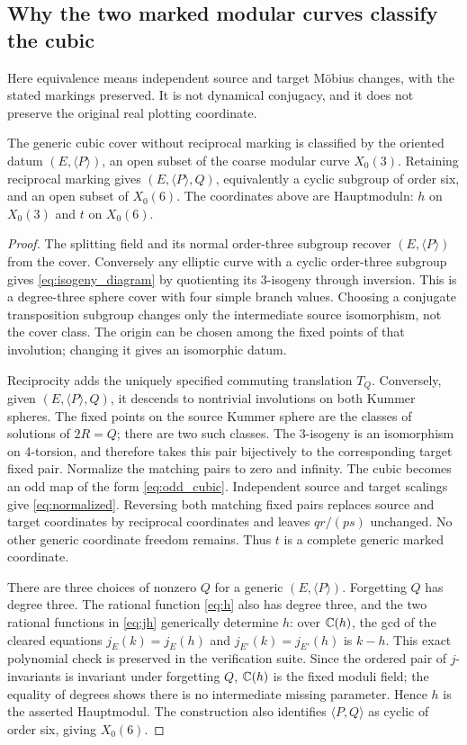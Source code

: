 \subsection{Why the two marked modular curves classify the cubic}\label{sec:moduli_proof}
Here equivalence means independent source and target Möbius changes, with the stated markings preserved. It is not dynamical conjugacy, and it does not preserve the original real plotting coordinate.

\begin{proposition}\label{prop:moduli}
The generic cubic cover without reciprocal marking is classified by the oriented datum \((E,\langle P\rangle)\), an open subset of the coarse modular curve \(X_0(3)\). Retaining reciprocal marking gives \((E,\langle P\rangle,Q)\), equivalently a cyclic subgroup of order six, and an open subset of \(X_0(6)\). The coordinates above are Hauptmoduln: \(h\) on \(X_0(3)\) and \(t\) on \(X_0(6)\).
\end{proposition}
\begin{proof}
The splitting field and its normal order-three subgroup recover \((E,\langle P\rangle)\) from the cover. Conversely any elliptic curve with a cyclic order-three subgroup gives \eqref{eq:isogeny_diagram} by quotienting its 3-isogeny through inversion. This is a degree-three sphere cover with four simple branch values. Choosing a conjugate transposition subgroup changes only the intermediate source isomorphism, not the cover class. The origin can be chosen among the fixed points of that involution; changing it gives an isomorphic datum.

Reciprocity adds the uniquely specified commuting translation \(T_Q\). Conversely, given \((E,\langle P\rangle,Q)\), it descends to nontrivial involutions on both Kummer spheres. The fixed points on the source Kummer sphere are the classes of solutions of \(2R=Q\); there are two such classes. The 3-isogeny is an isomorphism on 4-torsion, and therefore takes this pair bijectively to the corresponding target fixed pair. Normalize the matching pairs to zero and infinity. The cubic becomes an odd map of the form \eqref{eq:odd_cubic}. Independent source and target scalings give \eqref{eq:normalized}. Reversing both matching fixed pairs replaces source and target coordinates by reciprocal coordinates and leaves \(qr/(ps)\) unchanged. No other generic coordinate freedom remains. Thus \(t\) is a complete generic marked coordinate.

There are three choices of nonzero \(Q\) for a generic \((E,\langle P\rangle)\). Forgetting \(Q\) has degree three. The rational function \eqref{eq:h} also has degree three, and the two rational functions in \eqref{eq:jh} generically determine \(h\): over \(\mathbb C(h)\), the gcd of the cleared equations \(j_E(k)=j_E(h)\) and \(j_{E'}(k)=j_{E'}(h)\) is \(k-h\). This exact polynomial check is preserved in the verification suite. Since the ordered pair of \(j\)-invariants is invariant under forgetting \(Q\), \(\mathbb C(h)\) is the fixed moduli field; the equality of degrees shows there is no intermediate missing parameter. Hence \(h\) is the asserted Hauptmodul. The construction also identifies \(\langle P,Q\rangle\) as cyclic of order six, giving \(X_0(6)\).
\end{proof}

